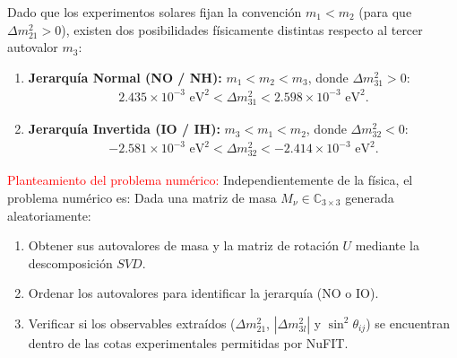 \documentclass[12pt]{article}
\begin{document}
\begin{cajaflex}
Dado que los experimentos solares fijan la convención $m_1 < m_2$ 
(para que $\Delta m_{21}^2 > 0$), existen dos posibilidades
físicamente distintas respecto al tercer autovalor $m_3$:
%
\begin{enumerate}
   \item \textbf{Jerarquía Normal (NO / NH):} $m_1 < m_2 < m_3$, donde $\Delta m_{31}^2 > 0$:
   \begin{align*}
      2.435 \times 10^{-3}\text{ eV}^2 < \Delta m_{31}^2 < 2.598 \times 10^{-3}\text{ eV}^2.
   \end{align*}
   \item \textbf{Jerarquía Invertida (IO / IH):} $m_3 < m_1 < m_2$, donde $\Delta m_{32}^2 < 0$:
   \begin{align*}
      -2.581 \times 10^{-3}\text{ eV}^2 < \Delta m_{32}^2 < -2.414 \times 10^{-3}\text{ eV}^2.
   \end{align*}
\end{enumerate}

\noindent\textcolor{red}{Planteamiento del problema numérico:} Independientemente de la
física, el problema numérico es:  
Dada una matriz de masa $M_\nu \in \mathbb{C}_{3 \times 3}$ generada aleatoriamente:
\begin{enumerate}[label=\roman*)]
   \item Obtener sus autovalores de masa y la matriz de rotación $U$ mediante la descomposición $SVD$.
   \item Ordenar los autovalores para identificar la jerarquía (NO o IO).
   \item Verificar si los observables extraídos ($\Delta m_{21}^2$, $|\Delta m_{3l}^2|$ y $\sin^2\theta_{ij}$)
    se encuentran dentro de las cotas experimentales permitidas por NuFIT.
\end{enumerate}
\end{cajaflex}
\end{document}
